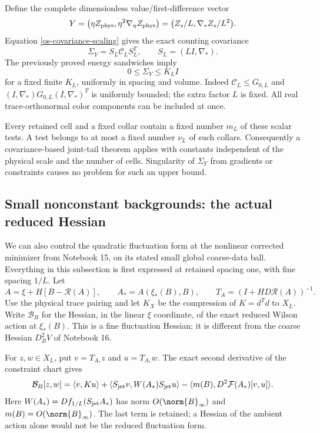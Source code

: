 Define the complete dimensionless value/first-difference vector
\begin{equation}\label{os-microscopic-field}
 Y=\bigl(\eta Z_{\rm phys},\eta^2\nabla_\eta Z_{\rm phys}\bigr)
   =\bigl(Z_s/L,\nabla_*Z_s/L^2\bigr).
\end{equation}
Equation \eqref{os-covariance-scaling} gives the exact counting
covariance
\begin{equation}\label{os-Y-covariance}
 \Sigma_Y=S_L\mathcal C_LS_L^T,
       \qquad S_L=(LI,\nabla_*).
\end{equation}
The previously proved energy sandwiches imply
\begin{equation}\label{os-uniform-covariance}
 0\le\Sigma_Y\le K_L I
\end{equation}
for a fixed finite $K_L$, uniformly in spacing and volume.
Indeed $\mathcal C_L\le G_{0,L}$ and
$(I,\nabla_*)G_{0,L}(I,\nabla_*)^T$ is uniformly bounded;
the extra factor $L$ is fixed. All real trace-orthonormal
color components can be included at once.

Every retained cell and a fixed collar contain a fixed number
$m_L$ of these scalar tests. A test belongs to at most a fixed
number $\nu_L$ of such collars. Consequently a covariance-based
joint-tail theorem applies with constants independent of the
physical scale and the number of cells. Singularity of
$\Sigma_Y$ from gradients or constraints causes no problem for
such an upper bound.

\subsection{Small nonconstant backgrounds: the actual reduced Hessian}
\label{os-nonflat}

We can also control the quadratic fluctuation form at the
nonlinear corrected minimizer from Notebook 15, on its stated
small global coarse-data ball. Everything in this subsection
is first expressed at retained spacing one, with fine spacing
$1/L$. Let
\[
 A=\xi+H[B-\mathcal R(A)],\qquad
 A_*=A(\xi_*(B),B),\qquad
 T_A=(I+HD\mathcal R(A))^{-1}.
\]
Use the physical trace pairing and let $K_X$ be the compression
of $K=d^Td$ to $X_L$. Write $\mathcal B_B$ for the Hessian,
in the linear $\xi$ coordinate, of the exact reduced Wilson
action at $\xi_*(B)$. This is a fine fluctuation Hessian;
it is different from the coarse Hessian $D_B^2V$ of Notebook 16.

For $z,w\in X_L$, put $v=T_{A_*}z$ and $u=T_{A_*}w$.
The exact second derivative of the constraint chart gives
\begin{equation}\label{os-reduced-form}
 \mathcal B_B[z,w]
  =\langle v,K u\rangle
   +\langle S_{\rm jet}v,W(A_*)S_{\rm jet}u\rangle
   -\langle m(B),D^2\mathcal F(A_*)[v,u]\rangle.
\end{equation}
Here $W(A_*)=Df_{1/L}(S_{\rm jet}A_*)$ has norm
$O(\norm{B}_\infty)$ and $m(B)=O(\norm{B}_\infty)$.
The last term is retained; a Hessian of the ambient action
alone would not be the reduced fluctuation form.

